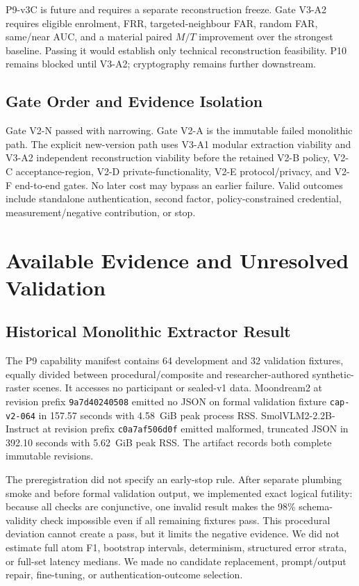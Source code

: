 \documentclass[compsoc,conference,a4paper,10pt,times]{IEEEtran}
\begin{document}
P9-v3C is future and requires a separate reconstruction freeze. Gate V3-A2 requires eligible enrolment, FRR, targeted-neighbour FAR, random FAR, same/near AUC, and a material paired $M/T$ improvement over the strongest baseline. Passing it would establish only technical reconstruction feasibility. P10 remains blocked until V3-A2; cryptography remains further downstream.

\subsection{Gate Order and Evidence Isolation}
Gate V2-N passed with narrowing. Gate V2-A is the immutable failed monolithic path. The explicit new-version path uses V3-A1 modular extraction viability and V3-A2 independent reconstruction viability before the retained V2-B policy, V2-C acceptance-region, V2-D private-functionality, V2-E protocol/privacy, and V2-F end-to-end gates. No later cost may bypass an earlier failure. Valid outcomes include standalone authentication, second factor, policy-constrained credential, measurement/negative contribution, or stop.

\section{Available Evidence and Unresolved Validation}
\label{sec:evidence}
\subsection{Historical Monolithic Extractor Result}
The P9 capability manifest contains 64 development and 32 validation fixtures, equally divided between procedural/composite and researcher-authored synthetic-raster scenes. It accesses no participant or sealed-v1 data. Moondream2 at revision prefix \texttt{9a7d40240508} emitted no JSON on formal validation fixture \texttt{cap-v2-064} in 157.57 seconds with 4.58~GiB peak process RSS. SmolVLM2-2.2B-Instruct at revision prefix \texttt{c0a7af506d0f} emitted malformed, truncated JSON in 392.10 seconds with 5.62~GiB peak RSS. The artifact records both complete immutable revisions.

The preregistration did not specify an early-stop rule. After separate plumbing smoke and before formal validation output, we implemented exact logical futility: because all checks are conjunctive, one invalid result makes the 98\% schema-validity check impossible even if all remaining fixtures pass. This procedural deviation cannot create a pass, but it limits the negative evidence. We did not estimate full atom F1, bootstrap intervals, determinism, structured error strata, or full-set latency medians. We made no candidate replacement, prompt/output repair, fine-tuning, or authentication-outcome selection.
\end{document}
